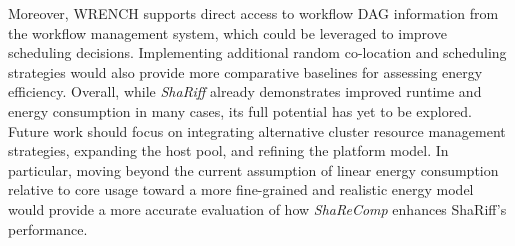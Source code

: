 Moreover, WRENCH supports direct access to workflow DAG information from the workflow management system, which could be leveraged to improve scheduling decisions. Implementing additional random co-location and scheduling strategies would also provide more comparative baselines for assessing energy efficiency.
Overall, while \textit{ShaRiff} already demonstrates improved runtime and energy consumption in many cases, its full potential has yet to be explored. Future work should focus on integrating alternative cluster resource management strategies, expanding the host pool, and refining the platform model. In particular, moving beyond the current assumption of linear energy consumption relative to core usage toward a more fine-grained and realistic energy model would provide a more accurate evaluation of how \textit{ShaReComp} enhances ShaRiff's performance.
